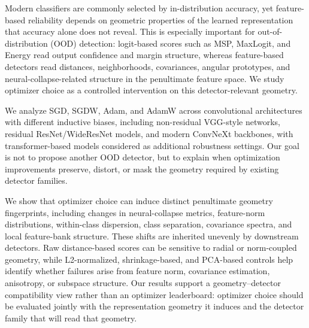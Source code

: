 Modern classifiers are commonly selected by in-distribution accuracy, yet
feature-based reliability depends on geometric properties of the learned
representation that accuracy alone does not reveal. This is especially important
for out-of-distribution (OOD) detection: logit-based scores such as MSP,
MaxLogit, and Energy read output confidence and margin structure, whereas
feature-based detectors read distances, neighborhoods, covariances, angular
prototypes, and neural-collapse-related structure in the penultimate feature
space. We study optimizer choice as a controlled intervention on this
detector-relevant geometry.

We analyze SGD, SGDW, Adam, and AdamW across convolutional architectures with
different inductive biases, including non-residual VGG-style networks, residual
ResNet/WideResNet models, and modern ConvNeXt backbones, with transformer-based
models considered as additional robustness settings. Our goal is not to propose
another OOD detector, but to explain when optimization improvements preserve,
distort, or mask the geometry required by existing detector families.

We show that optimizer choice can induce distinct penultimate geometry
fingerprints, including changes in neural-collapse metrics, feature-norm
distributions, within-class dispersion, class separation, covariance spectra,
and local feature-bank structure. These shifts are inherited unevenly by
downstream detectors. Raw distance-based scores can be sensitive to radial or
norm-coupled geometry, while L2-normalized, shrinkage-based, and PCA-based
controls help identify whether failures arise from feature norm, covariance
estimation, anisotropy, or subspace structure. Our results support a
geometry--detector compatibility view rather than an optimizer leaderboard:
optimizer choice should be evaluated jointly with the representation geometry it
induces and the detector family that will read that geometry.
